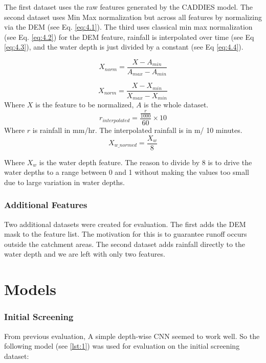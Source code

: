 The first dataset uses the raw features generated by the CADDIES model. The second dataset uses Min Max normalization but across all features by normalizing via the DEM (see Eq. \ref{eq:4.1}). The third uses classical min max normalization (see Eq. \ref{eq:4.2}) for the DEM feature, rainfall is interpolated over time (see Eq \ref{eq:4.3}), and the water depth is just divided by a constant  (see Eq \ref{eq:4.4}).

\begin{equation}
	\label{eq:4.1}
	X_{norm} = \frac{X-A_{min}}{A_{max}-A_{min}}
\end{equation}

\begin{equation}
	\label{eq:4.2}
	X_{norm} = \frac{X-X_{min}}{X_{max}-X_{min}}
\end{equation}
Where $X$ is the feature to be normalized, $A$ is the whole dataset.
\begin{equation}
	\label{eq:4.3}
	r_{interpolated} = \frac{\frac{r}{1000}}{60} \times 10
\end{equation}
Where $r$ is rainfall in mm/hr. The interpolated rainfall is in m/ 10 minutes.
\begin{equation}
	\label{eq:4.4}
	X_{w \_ normed} = \frac{X_{w}}{8}  
\end{equation}

Where $X_{w}$ is the water depth feature. The reason to divide by 8 is to drive the water depths to a range between 0 and 1 without making the values too small due to large variation in water depths.

\subsubsection*{Additional Features}
Two additional datasets were created for evaluation. The first adds the DEM mask to the feature list. The motivation for this is to guarantee  runoff occurs outside the catchment areas. The second dataset adds rainfall directly to the water depth and we are left with only two features.

\section{Models}

\subsubsection*{Initial Screening}
\label{DepthwiseCNN:init}
From previous evaluation, A simple depth-wise CNN seemed to work well.  So the following model (see \ref{lst:1}) was used for evaluation on the initial screening dataset:

